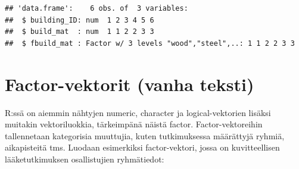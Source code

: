 \documentclass[
]{book}
\newenvironment{Shaded}{\begin{snugshade}}{\end{snugshade}}
\newcommand{\AttributeTok}[1]{\textcolor[rgb]{0.77,0.63,0.00}{#1}}
\newcommand{\CommentTok}[1]{\textcolor[rgb]{0.56,0.35,0.01}{\textit{#1}}}
\newcommand{\DecValTok}[1]{\textcolor[rgb]{0.00,0.00,0.81}{#1}}
\newcommand{\FunctionTok}[1]{\textcolor[rgb]{0.00,0.00,0.00}{#1}}
\newcommand{\NormalTok}[1]{#1}
\newcommand{\OtherTok}[1]{\textcolor[rgb]{0.56,0.35,0.01}{#1}}
\newcommand{\SpecialCharTok}[1]{\textcolor[rgb]{0.00,0.00,0.00}{#1}}
\newcommand{\StringTok}[1]{\textcolor[rgb]{0.31,0.60,0.02}{#1}}
\begin{document}
\begin{Shaded}
\end{Shaded}

\begin{verbatim}
## 'data.frame':    6 obs. of  3 variables:
##  $ building_ID: num  1 2 3 4 5 6
##  $ build_mat  : num  1 1 2 2 3 3
##  $ fbuild_mat : Factor w/ 3 levels "wood","steel",..: 1 1 2 2 3 3
\end{verbatim}

\hypertarget{factor-vektorit-vanha-teksti}{%
\section{Factor-vektorit (vanha teksti)}\label{factor-vektorit-vanha-teksti}}

R:ssä on aiemmin nähtyjen numeric, character ja logical-vektorien lisäksi muitakin vektoriluokkia, tärkeimpänä näistä factor. Factor-vektoreihin tallennetaan kategorisia muuttujia, kuten tutkimuksessa määrättyjä ryhmiä, aikapisteitä tms. Luodaan esimerkiksi factor-vektori, jossa on kuvitteellisen lääketutkimuksen osallistujien ryhmätiedot:
\end{document}
